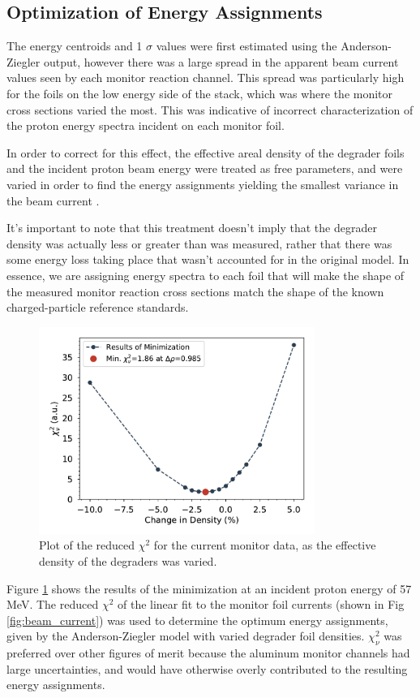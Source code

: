 \documentclass[aps,twocolumn,secnumarabic,balancelastpage,amsmath,amssymb,nofootinbib,floatfix]{revtex4-1}
\begin{document}
\subsection{Optimization of Energy Assignments}

The energy centroids and 1 $\sigma$ values were first estimated using the Anderson-Ziegler output, however there was a large spread in the apparent beam current values seen by each monitor reaction channel.  This spread was particularly high for the foils on the low energy side of the stack, which was where the monitor cross sections varied the most.  This was indicative of incorrect characterization of the proton energy spectra incident on each monitor foil.

In order to correct for this effect, the effective areal density of the degrader foils and the incident proton beam energy were treated as free parameters, and were varied in order to find the energy assignments yielding the smallest variance in the beam current \cite{GRAVES201644}.

It's important to note that this treatment doesn't imply that the degrader density was actually less or greater than was measured, rather that there was some energy loss taking place that wasn't accounted for in the original model.  In essence, we are assigning energy spectra to each foil that will make the shape of the measured monitor reaction cross sections match the shape of the known charged-particle reference standards.

\begin{figure}[htb]
\includegraphics[width=9cm]{monitors/minimize_az}
\caption{Plot of the reduced $\chi^2$ for the current monitor data, as the effective density of the degraders was varied.
}
\label{fig:minimization}
\end{figure}

Figure \ref{fig:minimization} shows the results of the minimization at an incident proton energy of 57 MeV.  The reduced $\chi^2$ of the linear fit to the monitor foil currents (shown in Fig \ref{fig:beam_current}) was used to determine the optimum energy assignments, given by the Anderson-Ziegler model with varied degrader foil densities.  $\chi^2_{\nu}$ was preferred over other figures of merit because the aluminum monitor channels had large uncertainties, and would have otherwise overly contributed to the resulting energy assignments.
\end{document}
